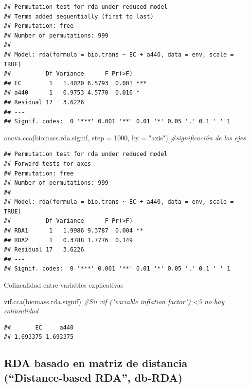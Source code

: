 \documentclass[
]{book}
\newenvironment{Shaded}{\begin{snugshade}}{\end{snugshade}}
\newcommand{\AttributeTok}[1]{\textcolor[rgb]{0.77,0.63,0.00}{#1}}
\newcommand{\CommentTok}[1]{\textcolor[rgb]{0.56,0.35,0.01}{\textit{#1}}}
\newcommand{\DecValTok}[1]{\textcolor[rgb]{0.00,0.00,0.81}{#1}}
\newcommand{\FunctionTok}[1]{\textcolor[rgb]{0.00,0.00,0.00}{#1}}
\newcommand{\NormalTok}[1]{#1}
\newcommand{\StringTok}[1]{\textcolor[rgb]{0.31,0.60,0.02}{#1}}
\begin{document}
\begin{verbatim}
## Permutation test for rda under reduced model
## Terms added sequentially (first to last)
## Permutation: free
## Number of permutations: 999
## 
## Model: rda(formula = bio.trans ~ EC + a440, data = env, scale = TRUE)
##          Df Variance      F Pr(>F)    
## EC        1   1.4020 6.5793  0.001 ***
## a440      1   0.9753 4.5770  0.016 *  
## Residual 17   3.6226                  
## ---
## Signif. codes:  0 '***' 0.001 '**' 0.01 '*' 0.05 '.' 0.1 ' ' 1
\end{verbatim}

\begin{Shaded}
\begin{Highlighting}[]
\FunctionTok{anova.cca}\NormalTok{(biomass.rda.signif, }\AttributeTok{step =} \DecValTok{1000}\NormalTok{, }\AttributeTok{by =} \StringTok{"axis"}\NormalTok{) }\CommentTok{\#significación de los ejes}
\end{Highlighting}
\end{Shaded}

\begin{verbatim}
## Permutation test for rda under reduced model
## Forward tests for axes
## Permutation: free
## Number of permutations: 999
## 
## Model: rda(formula = bio.trans ~ EC + a440, data = env, scale = TRUE)
##          Df Variance      F Pr(>F)   
## RDA1      1   1.9986 9.3787  0.004 **
## RDA2      1   0.3788 1.7776  0.149   
## Residual 17   3.6226                 
## ---
## Signif. codes:  0 '***' 0.001 '**' 0.01 '*' 0.05 '.' 0.1 ' ' 1
\end{verbatim}

Colinealidad entre variables explicativas

\begin{Shaded}
\begin{Highlighting}[]
\FunctionTok{vif.cca}\NormalTok{(biomass.rda.signif) }\CommentTok{\#Sii vif ("variable inflation factor") \textless{}5 no hay colinealidad}
\end{Highlighting}
\end{Shaded}

\begin{verbatim}
##       EC     a440 
## 1.693375 1.693375
\end{verbatim}

\hypertarget{rda-basado-en-matriz-de-distancia-distance-based-rda-db-rda}{%
\subsection{RDA basado en matriz de distancia (``Distance-based RDA'', db-RDA)}\label{rda-basado-en-matriz-de-distancia-distance-based-rda-db-rda}}
\end{document}
